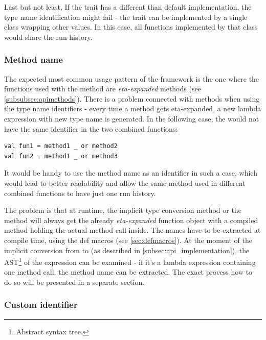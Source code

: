 Last but not least, If the  trait has a different than default implementation, the type name identification might fail - the trait can be implemented by a single class wrapping other values. In this case, all functions implemented by that class would share the run history.

\subsubsection{Method name}
\label{subsec:methodnameident}


The expected most common usage pattern of the framework is the one where the functions used with the  method are \textit{eta-expanded} methods (see \ref{subsubsec:apimethods}). There is a problem connected with methods when using the type name identifiers - every time a method gets eta-expanded, a new lambda expression with new type name is generated. In the following case, the  would not have the same identifier in the two combined functions:

\lstset{style=Scala}
\begin{lstlisting}
val fun1 = method1 _ or method2
val fun2 = method1 _ or method3
\end{lstlisting}



It would be handy to use the method name as an identifier in such a case, which would lead to better readability and allow the same method used in different combined functions to have just one run history.

The problem is that at runtime, the implicit type conversion method or the  method will always get the already \textit{eta-expanded} function object with a compiled  method holding the actual method call inside. The names have to be extracted at compile time, using the def macros (see \ref{sec:defmacros}). At the moment of the implicit conversion from  to  (as described in \ref{subsec:api_implementation}), the AST\footnote{Abstract syntax tree.} of the  expression can be examined - if it's a lambda expression containing one method call, the method name can be extracted. The exact process how to do so will be presented in a separate section.

\subsubsection{Custom identifier}
\label{subsubsec:custom_identifier}

